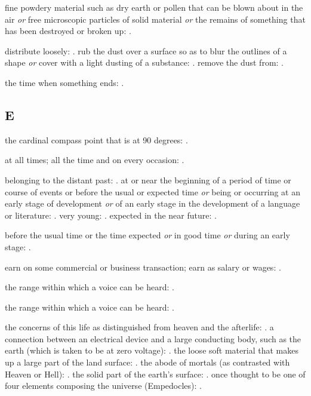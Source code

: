   fine powdery material such as dry earth or pollen that can be blown about in the air \textit{or} free microscopic particles of solid material \textit{or} the remains of something that has been destroyed or broken up: .

  distribute loosely: . rub the dust over a surface so as to blur the outlines of a shape \textit{or} cover with a light dusting of a substance: . remove the dust from: .

  the time when something ends: .

\subsection*{E}

  the cardinal compass point that is at 90 degrees: .

  at all times; all the time and on every occasion: .

  belonging to the distant past: . at or near the beginning of a period of time or course of events or before the usual or expected time \textit{or} being or occurring at an early stage of development \textit{or} of an early stage in the development of a language or literature: . very young: . expected in the near future: .

  before the usual time or the time expected \textit{or} in good time \textit{or} during an early stage: .

  earn on some commercial or business transaction; earn as salary or wages: .

  the range within which a voice can be heard: .

  the range within which a voice can be heard: .

  the concerns of this life as distinguished from heaven and the afterlife: . a connection between an electrical device and a large conducting body, such as the earth (which is taken to be at zero voltage): . the loose soft material that makes up a large part of the land surface: . the abode of mortals (as contrasted with Heaven or Hell): . the solid part of the earth's surface: . once thought to be one of four elements composing the universe (Empedocles): .

